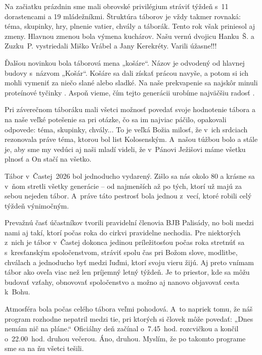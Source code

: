 Na začiatku prázdnin sme mali obrovské privilégium stráviť týždeň s~11 dorastencami a 19 mládežníkmi.
Štruktúra táborov je vždy takmer rovnaká: téma, skupinky, hry, plnenie vatier, chvály a táborák. Tento rok však priniesol aj zmeny. Hlavnou zmenou bola výmena kuchárov. Našu vernú dvojicu Hanku~Š. a Zuzku~P. vystriedali Miško Vrábel a Jany Kerekréty. Varili úžasne!!!

Ďalšou novinkou bola táborová mena „košáre“. Názov je odvodený od hlavnej budovy s~názvom „Košár“. Košáre sa dali získať prácou navyše, a potom si ich mohli vymeniť za niečo slané alebo sladké. Na naše prekvapenie sa najskôr minuli proteínové tyčinky \smiley. Aspoň vieme, čím tejto generácii urobíme najväčšiu radosť \smiley.

Pri záverečnom táboráku mali všetci možnosť povedať svoje hodnotenie tábora a na naše veľké potešenie sa pri otázke, čo sa im najviac páčilo, opakovali odpovede: téma, skupinky, chvály...
To je veľká Božia milosť, že v~ich srdciach rezonovala práve téma, ktorou bol list Kolosenským. A~našou túžbou bolo a stále je, aby sme my vedúci aj naši mladí videli, že v~Pánovi Ježišovi máme všetku plnosť a On stačí na všetko.


Tábor v~Častej~2026 bol jednoducho vydarený. Zišlo sa nás okolo 80 a krásne
sa v~ňom stretli všetky generácie -- od najmenších až po tých, ktorí už majú za sebou nejeden tábor. A~práve táto pestrosť bola jednou z~vecí, ktoré robili celý týždeň výnimočným.

Prevažnú časť účastníkov tvorili pravidelní členovia BJB Palisády, no boli medzi nami aj takí, ktorí počas roka do cirkvi pravidelne nechodia.
Pre niektorých z~nich je tábor v~Častej dokonca jedinou príležitosťou počas roka stretnúť sa s~kresťanským spoločenstvom, stráviť spolu čas pri Božom slove, modlitbe, chválach a jednoducho byť medzi ľuďmi, ktorí svoju vieru žijú. Aj preto vnímam tábor ako oveľa viac než len príjemný letný týždeň.
Je to priestor, kde sa môžu budovať vzťahy, obnovovať spoločenstvo a možno aj nanovo objavovať cesta k~Bohu.

Atmosféra bola počas celého tábora veľmi pohodová. A~to napriek tomu, že náš program rozhodne nepatril medzi tie, pri ktorých si človek môže povedať: „Dnes nemám nič na pláne.“ Oficiálny deň začínal o~7.45~hod. rozcvičkou a končil o~22.00~hod. druhou večerou. Áno, druhou. Myslím, že po takomto programe sme sa na ňu všetci tešili.

